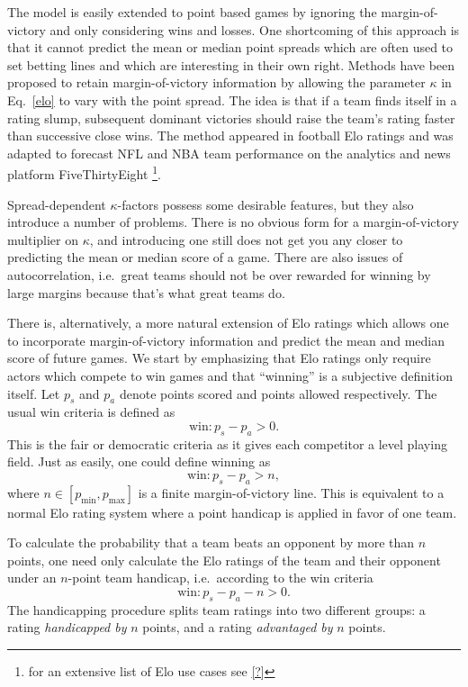\documentclass[aps,prc,reprint,amsmath,superscriptaddress]{revtex4-1}
\begin{document}
The model is easily extended to point based games by ignoring the margin-of-victory and only considering wins and losses.
One shortcoming of this approach is that it cannot predict the mean or median point spreads which are often used to set betting lines and which are interesting in their own right.
Methods have been proposed to retain margin-of-victory information by allowing the parameter $\kappa$ in Eq.~\eqref{elo} to vary with the point spread.
The idea is that if a team finds itself in a rating slump, subsequent dominant victories should raise the team's rating faster than successive close wins.
The method appeared in football Elo ratings \cite{?} and was adapted to forecast NFL and NBA team performance on the analytics and news platform FiveThirtyEight \footnote{for an extensive list of Elo use cases see \ref{?}}.

Spread-dependent $\kappa$-factors possess some desirable features, but they also introduce a number of problems.
There is no obvious form for a margin-of-victory multiplier on $\kappa$, and introducing one still does not get you any closer to predicting the mean or median score of a game.
There are also issues of autocorrelation, i.e.\ great teams should not be over rewarded for winning by large margins because that's what great teams do.

There is, alternatively, a more natural extension of Elo ratings which allows one to incorporate margin-of-victory information and predict the mean and median score of future games.
We start by emphasizing that Elo ratings only require actors which compete to win games and that ``winning'' is a subjective definition itself.
Let $p_s$ and $p_a$ denote points scored and points allowed respectively.
The usual win criteria is defined as
\begin{equation}
  \text{win}: p_s - p_a > 0.
\end{equation}
This is the fair or democratic criteria as it gives each competitor a level playing field.
Just as easily, one could define winning as
\begin{equation}
  \text{win}: p_s - p_a > n,
\end{equation}
where $n \in [p_\text{min}, p_\text{max}]$ is a finite margin-of-victory line.
This is equivalent to a normal Elo rating system where a point handicap is applied in favor of one team.

To calculate the probability that a team beats an opponent by more than $n$ points, one need only calculate the Elo ratings of the team and their opponent under an $n$-point team handicap, i.e.\ according to the win criteria
\begin{equation}
  \text{win}: p_s - p_a - n > 0.
\end{equation}
The handicapping procedure splits team ratings into two different groups: a rating \emph{handicapped by} $n$ points, and a rating \emph{advantaged by} $n$ points.
\end{document}
